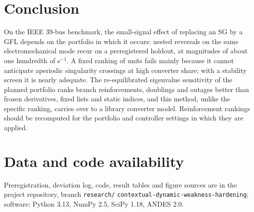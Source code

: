 \documentclass[journal]{IEEEtran}
\theoremstyle{remark}
\begin{document}
\section{Conclusion}
On the IEEE 39-bus benchmark, the small-signal effect of replacing an SG by a GFL
depends on the portfolio in which it occurs: nested reversals on the same
electromechanical mode recur on a preregistered holdout, at magnitudes of about
one hundredth of s$^{-1}$. A fixed ranking of units fails mainly because it cannot
anticipate aperiodic singularity crossings at high converter share; with a
stability screen it is nearly adequate. The re-equilibrated eigenvalue
sensitivity of the planned portfolio ranks branch reinforcements, doublings and
outages better than frozen derivatives, fixed lists and static indices, and this
method, unlike the specific ranking, carries over to a library converter model.
Reinforcement rankings should be recomputed for the portfolio and controller
settings in which they are applied.

\section*{Data and code availability}
Preregistration, deviation log, code, result tables and figure sources are in the
project repository, branch \texttt{research/}\allowbreak
\texttt{contextual-dynamic-weakness-hardening}; software: Python 3.13, NumPy 2.5,
SciPy 1.18, ANDES 2.0.



\end{document}
